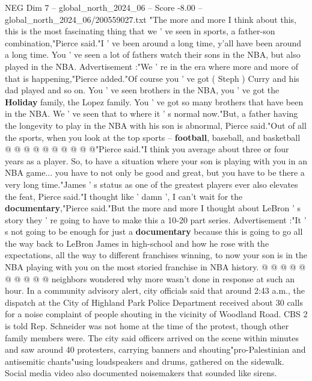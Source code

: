 \begin{textsample}{NEG Dim 7 – global\_north\_2024\_06 – Score -8.00 – global\_north\_2024\_06/200559027.txt}  \label{ex:f7_neg_137}
"The more and more I think about this, this is the most fascinating thing that we ' ve seen in sports, a father-son combination,"Pierce said."I ' ve been around a long time, y'all have been around a long time.
You ' ve seen a lot of fathers watch their sons in the NBA, but also played in the NBA.
Advertisement :"We ' re in the era where more and more of that is happening,"Pierce added."Of course you ' ve got ( Steph ) Curry and his dad played and so on.
You ' ve seen brothers in the NBA, you ' ve got the \textbf{Holiday} family, the Lopez family.
You ' ve got so many brothers that have been in the NBA.
We ' ve seen that to where it ' s normal now."But, a father having the longevity to play in the NBA with his son is abnormal, Pierce said."Out of all the sports, when you look at the top sports -- \textbf{football}, baseball, and basketball @ @ @ @ @ @ @ @ @ @"Pierce said."I think you average about three or four years as a player.
So, to have a situation where your son is playing with you in an NBA game... you have to not only be good and great, but you have to be there a very long time."James ' s status as one of the greatest players ever also elevates the feat, Pierce said."I thought like ' damn ', I can't wait for the \textbf{documentary},"Pierce said."But the more and more I thought about LeBron ' s story they ' re going to have to make this a 10-20 part series.
Advertisement :"It ' s not going to be enough for just a \textbf{documentary} because this is going to go all the way back to LeBron James in high-school and how he rose with the expectations, all the way to different franchises winning, to now your son is in the NBA playing with you on the most storied franchise in NBA history. @ @ @ @ @ @ @ @ @ @ neighbors wondered why more wasn't done in response at such an hour.
In a community advisory alert, city officials said that around 2:43 a.m., the dispatch at the City of Highland Park Police Department received about 30 calls for a noise complaint of people shouting in the vicinity of Woodland Road.
CBS 2 is told Rep.
Schneider was not home at the time of the protest, though other family members were.
The city said officers arrived on the scene within minutes and saw around 40 protesters, carrying banners and shouting"pro-Palestinian and antisemitic chants"using loudspeakers and drums, gathered on the sidewalk.
Social media video also documented noisemakers that sounded like sirens.

\end{textsample}
